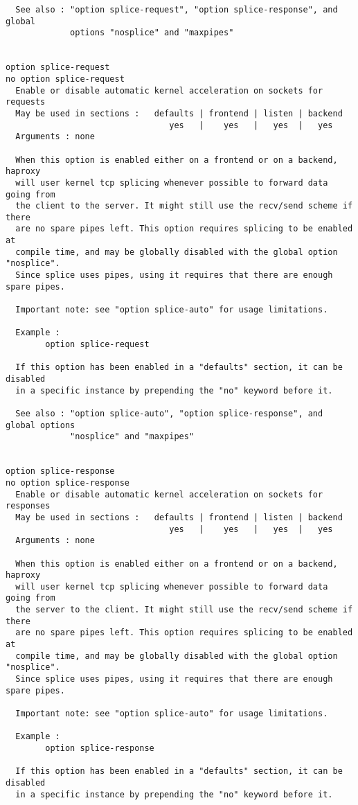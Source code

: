 \begin{verbatim}
  See also : "option splice-request", "option splice-response", and global
             options "nosplice" and "maxpipes"


option splice-request
no option splice-request
  Enable or disable automatic kernel acceleration on sockets for requests
  May be used in sections :   defaults | frontend | listen | backend
                                 yes   |    yes   |   yes  |   yes
  Arguments : none

  When this option is enabled either on a frontend or on a backend, haproxy
  will user kernel tcp splicing whenever possible to forward data going from
  the client to the server. It might still use the recv/send scheme if there
  are no spare pipes left. This option requires splicing to be enabled at
  compile time, and may be globally disabled with the global option "nosplice".
  Since splice uses pipes, using it requires that there are enough spare pipes.

  Important note: see "option splice-auto" for usage limitations.

  Example :
        option splice-request

  If this option has been enabled in a "defaults" section, it can be disabled
  in a specific instance by prepending the "no" keyword before it.

  See also : "option splice-auto", "option splice-response", and global options
             "nosplice" and "maxpipes"


option splice-response
no option splice-response
  Enable or disable automatic kernel acceleration on sockets for responses
  May be used in sections :   defaults | frontend | listen | backend
                                 yes   |    yes   |   yes  |   yes
  Arguments : none

  When this option is enabled either on a frontend or on a backend, haproxy
  will user kernel tcp splicing whenever possible to forward data going from
  the server to the client. It might still use the recv/send scheme if there
  are no spare pipes left. This option requires splicing to be enabled at
  compile time, and may be globally disabled with the global option "nosplice".
  Since splice uses pipes, using it requires that there are enough spare pipes.

  Important note: see "option splice-auto" for usage limitations.

  Example :
        option splice-response

  If this option has been enabled in a "defaults" section, it can be disabled
  in a specific instance by prepending the "no" keyword before it.


\end{verbatim}
